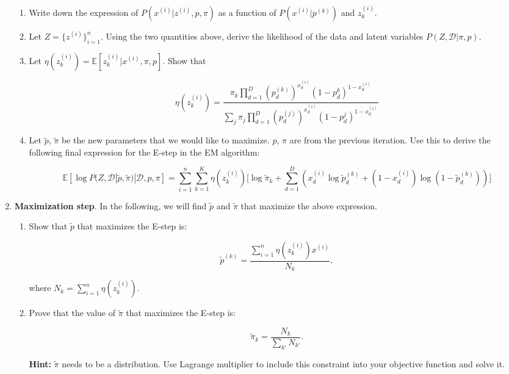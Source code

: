 \begin{Q}
\begin{enumerate}
\begin{enumerate}
\item Write down the expression of $P(x^{(i)}| z^{(i)}, p, \pi  )$ as a function of $P(x^{(i)}|p^{(k)})$ and $z_{k}^{(i)}$.

\item Let $Z= \{ z^{(i)}\}_{i=1}^{n}$. Using the two quantities above, derive the likelihood of the data and latent variables $P(Z,\mathcal{D}|\pi, p)$.

\item Let $\eta(z_{k}^{(i)}) = \mathbb{E} [z_{k}^{(i)}| x^{(i)}, \pi, p  ]$. Show that 

$$
\eta(z_{k}^{(i)})  = \frac{\pi_{k}  \prod_{d=1}^{D} (p_{d}^{(k)})^{x_{d}^{(i)} } (1-p_{d}^{k})^{1-x_{d}^{(i)}}  }{ \sum_{j}  \pi_{j}  \prod_{d=1}^{D} (p_{d}^{(j)})^{x_{d}^{(i)} } (1-p_{d}^{j})^{1-x_{d}^{(i)}}   }
$$

\item Let $\tilde{p}$, $\tilde{\pi}$ be the new parameters that we would like to maximize. $p$, $\pi$ are from the previous iteration. Use this to derive the following final expression for the E-step in the EM algorithm:

$$
\mathbb{E}[\log P(Z, \mathcal{D} | \tilde{ p}, \tilde{\pi}  ) | \mathcal{D} , p, \pi    ] = \sum_{i=1}^{n} \sum_{k=1}^{K} \eta(z_{k}^{(i)}) \Big[ \log{\tilde{\pi}_{k} } + \sum_{d=1}^{D} (  x_{d}^{(i)} \log \tilde{p}_{d}^{(k)}+ (1-x_{d}^{(i)}) \log(1-  \tilde{p}_{d}^{(k)}  )  )   \Big]
$$
\end{enumerate}


\item  \textbf{Maximization step}. In the following, we will find $\tilde{p}$ and $\tilde{\pi}$ that maximize the above expression. 
\begin{enumerate}
\item Show that $\tilde{p}$ that maximizes the E-step is:

$$
\tilde{p}^{(k)} = \frac{  \sum_{i=1}^{n} \eta(z_{k}^{(i)} ) x^{(i)}   }{N_k},
$$

where $N_{k} = \sum_{i=1}^{n} \eta( z_{k}^{(i)} )$.

\item Prove that the value of $\tilde{\pi}$ that maximizes the E-step is:

$$
\tilde{\pi}_{k} = \frac{N_{k}}{ \sum_{k'} N_{k'} }.
$$

\textbf{Hint:} $\tilde{\pi}$ needs to be a distribution. Use Lagrange multiplier to include this constraint into your objective function and solve it.

\end{enumerate}

\end{enumerate}
\end{Q}
